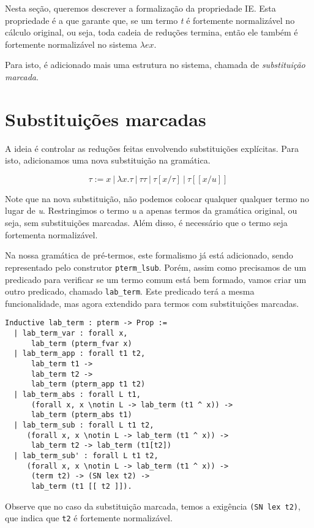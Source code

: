 Nesta seção, queremos descrever a formalização da propriedade IE.
Esta propriedade é a que garante que, se um termo \emph{t} é fortemente
normalizável no cálculo original, ou seja, toda cadeia de reduções termina,
então ele também é fortemente normalizável no sistema $\lambda ex$.

Para isto, é adicionado mais uma estrutura no sistema, chamada de
\emph{substituição marcada}.

\section{Substituições marcadas}
\label{sec:substitui_es_marcadas}

A ideia é controlar as reduções feitas envolvendo substituições explícitas. Para
isto, adicionamos uma nova substituição na gramática.

\[ \tau := x\ |\ \lambda x.\tau\ |\ \tau \tau\ |\ \tau[x/\tau]\ |\
    \tau[[x/u]]\ \]

Note que na nova substituição, não podemos colocar qualquer qualquer termo no
lugar de \emph{u}. Restringimos o termo \emph{u} a apenas termos da gramática
original, ou seja, sem substituições marcadas. Além disso, é necessário que o
termo seja fortementa normalizável.

Na nossa gramática de pré-termos, este formalismo já está adicionado, sendo
representado pelo construtor \texttt{pterm\_lsub}. Porém, assim como precisamos
de um predicado para verificar se um termo comum está bem formado, vamos criar
um outro predicado, chamado \texttt{lab\_term}. Este predicado terá a mesma
funcionalidade, mas agora extendido para termos com substituições marcadas. 

\begin{lstlisting}[basicstyle=\small]
Inductive lab_term : pterm -> Prop :=
  | lab_term_var : forall x,
      lab_term (pterm_fvar x)
  | lab_term_app : forall t1 t2,
      lab_term t1 -> 
      lab_term t2 -> 
      lab_term (pterm_app t1 t2)
  | lab_term_abs : forall L t1,
      (forall x, x \notin L -> lab_term (t1 ^ x)) ->
      lab_term (pterm_abs t1)
  | lab_term_sub : forall L t1 t2,
     (forall x, x \notin L -> lab_term (t1 ^ x)) ->
      lab_term t2 -> lab_term (t1[t2])
  | lab_term_sub' : forall L t1 t2,
     (forall x, x \notin L -> lab_term (t1 ^ x)) ->
      (term t2) -> (SN lex t2) -> 
      lab_term (t1 [[ t2 ]]).
\end{lstlisting}

Observe que no caso da substituição marcada, temos a exigência \texttt{(SN lex
    t2)}, que indica que \texttt{t2} é fortemente normalizável.

